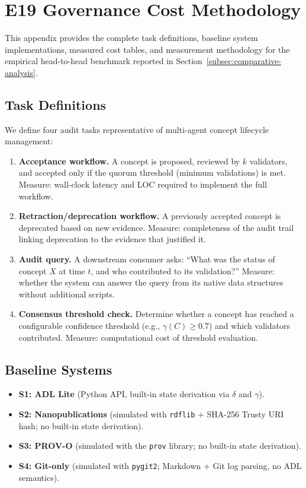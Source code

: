\section{E19 Governance Cost Methodology}\label{app:e19}

This appendix provides the complete task definitions, baseline system implementations, measured cost tables, and measurement methodology for the empirical head-to-head benchmark reported in Section~\ref{subsec:comparative-analysis}.

\subsection{Task Definitions}

We define four audit tasks representative of multi-agent concept lifecycle management:

\begin{enumerate}[label=T\arabic*:, leftmargin=3em]
    \item \textbf{Acceptance workflow.} A concept is proposed, reviewed by $k$ validators, and accepted only if the quorum threshold (minimum validations) is met. Measure: wall-clock latency and LOC required to implement the full workflow.
    \item \textbf{Retraction/deprecation workflow.} A previously accepted concept is deprecated based on new evidence. Measure: completeness of the audit trail linking deprecation to the evidence that justified it.
    \item \textbf{Audit query.} A downstream consumer asks: ``What was the status of concept $X$ at time $t$, and who contributed to its validation?'' Measure: whether the system can answer the query from its native data structures without additional scripts.
    \item \textbf{Consensus threshold check.} Determine whether a concept has reached a configurable confidence threshold (e.g., $\gamma(C) \geq 0.7$) and which validators contributed. Measure: computational cost of threshold evaluation.
\end{enumerate}

\subsection{Baseline Systems}

\begin{itemize}[leftmargin=2em]
    \item \textbf{S1: ADL Lite} (Python API, built-in state derivation via $\delta$ and $\gamma$).
    \item \textbf{S2: Nanopublications} (simulated with \texttt{rdflib} + SHA-256 Trusty URI hash; no built-in state derivation).
    \item \textbf{S3: PROV-O} (simulated with the \texttt{prov} library; no built-in state derivation).
    \item \textbf{S4: Git-only} (simulated with \texttt{pygit2}; Markdown + Git log parsing, no ADL semantics).
\end{itemize}

